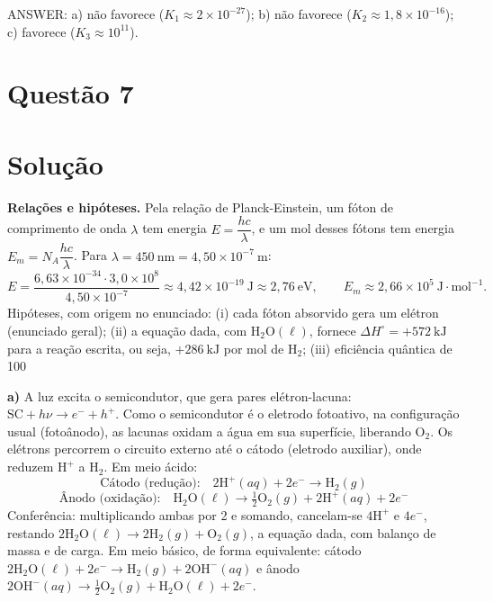\documentclass{article}%
\begin{document}
ANSWER: a) não favorece ($K_1 \approx 2\times10^{-27}$); b) não favorece ($K_2 \approx 1{,}8\times10^{-16}$); c) favorece ($K_3 \approx 10^{11}$).%
\newpage%
\section*{Questão 7}

\section*{Solução}

\textbf{Relações e hipóteses.} Pela relação de Planck-Einstein, um fóton de comprimento de onda $\lambda$ tem energia $E=\dfrac{hc}{\lambda}$, e um mol desses fótons tem energia $E_m=N_A\dfrac{hc}{\lambda}$. Para $\lambda=450\ \text{nm}=4{,}50\times10^{-7}\ \text{m}$:
\[
E=\frac{6{,}63\times10^{-34}\cdot 3{,}0\times10^{8}}{4{,}50\times10^{-7}}\approx 4{,}42\times10^{-19}\ \text{J}\approx 2{,}76\ \text{eV},\qquad E_m\approx 2{,}66\times10^{5}\ \text{J}\cdot\text{mol}^{-1}.
\]
Hipóteses, com origem no enunciado: (i) cada fóton absorvido gera um elétron (enunciado geral); (ii) a equação dada, com $\text{H}_2\text{O}(\ell)$, fornece $\Delta H^{\circ}=+572\ \text{kJ}$ para a reação escrita, ou seja, $+286\ \text{kJ}$ por mol de $\text{H}_2$; (iii) eficiência quântica de 100%

\textbf{a)} A luz excita o semicondutor, que gera pares elétron-lacuna: $\text{SC}+h\nu\rightarrow e^{-}+h^{+}$. Como o semicondutor é o eletrodo fotoativo, na configuração usual (fotoânodo), as lacunas oxidam a água em sua superfície, liberando $\text{O}_2$. Os elétrons percorrem o circuito externo até o cátodo (eletrodo auxiliar), onde reduzem $\text{H}^{+}$ a $\text{H}_2$. Em meio ácido:
\[
\text{Cátodo (redução):}\quad 2\text{H}^{+}(aq)+2e^{-}\rightarrow\text{H}_2(g)
\]
\[
\text{Ânodo (oxidação):}\quad \text{H}_2\text{O}(\ell)\rightarrow\tfrac{1}{2}\text{O}_2(g)+2\text{H}^{+}(aq)+2e^{-}
\]
Conferência: multiplicando ambas por 2 e somando, cancelam-se $4\text{H}^{+}$ e $4e^{-}$, restando $2\text{H}_2\text{O}(\ell)\rightarrow 2\text{H}_2(g)+\text{O}_2(g)$, a equação dada, com balanço de massa e de carga. Em meio básico, de forma equivalente: cátodo $2\text{H}_2\text{O}(\ell)+2e^{-}\rightarrow\text{H}_2(g)+2\text{OH}^{-}(aq)$ e ânodo $2\text{OH}^{-}(aq)\rightarrow\tfrac{1}{2}\text{O}_2(g)+\text{H}_2\text{O}(\ell)+2e^{-}$.
\end{document}
